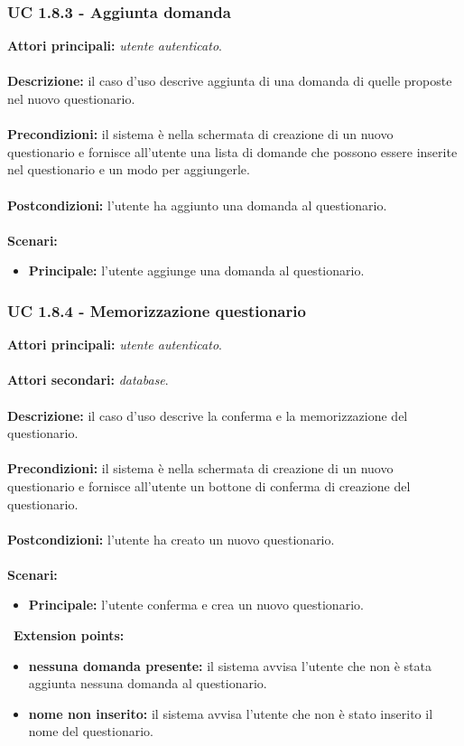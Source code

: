 \documentclass[a4paper,11pt]{article}
\begin{document}
\subsubsection{UC 1.8.3 - Aggiunta domanda}

\textbf{Attori principali:} \textit{utente autenticato}.\\
\\
\textbf{Descrizione:} il caso d'uso descrive aggiunta di una domanda di quelle proposte nel nuovo questionario. \\
\\
\textbf{Precondizioni:} il sistema è nella schermata di creazione di un nuovo questionario e fornisce all'utente una lista di domande che possono essere inserite nel questionario e un modo per aggiungerle.\\
\\
\textbf{Postcondizioni:} l'utente ha aggiunto una domanda al questionario. \\
\\
\newpage
\textbf{Scenari:}
\begin{itemize}
\item \textbf{Principale:} l'utente aggiunge una domanda al questionario.
\end{itemize}
\vspace{6 mm}
\subsubsection{UC 1.8.4 - Memorizzazione questionario}

\textbf{Attori principali:} \textit{utente autenticato}.\\
\\
\textbf{Attori secondari:} \textit{database}.\\
\\
\textbf{Descrizione:} il caso d'uso descrive la conferma e la memorizzazione del questionario. \\
\\
\textbf{Precondizioni:} il sistema è nella schermata di creazione di un nuovo questionario e fornisce all'utente un bottone di conferma di creazione del questionario.\\
\\
\textbf{Postcondizioni:} l'utente ha creato un nuovo questionario. \\
\\
\textbf{Scenari:}
\begin{itemize}
\item \textbf{Principale:} l'utente conferma e crea un nuovo questionario.
\end{itemize}
\
\textbf{Extension points:}
\begin{itemize}
\item \textbf{nessuna domanda presente:} il sistema avvisa l'utente che non è stata aggiunta nessuna domanda al questionario.
\item \textbf{nome non inserito:} il sistema avvisa l'utente che non è stato inserito il nome del questionario.
\end{itemize}
\end{document}
